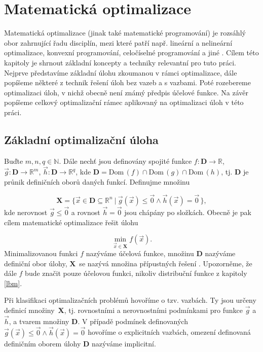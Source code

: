 \chapter{Matematická optimalizace}\label{optimalizace}

Matematická optimalizace (jinak také matematické programování) je rozsáhlý obor zahrnující řadu disciplín, mezi které patří např. lineární a nelineární optimalizace, konvexní programování, celočíselné programování a jiné \cite{Bert}. Cílem této kapitoly je shrnout základní koncepty a techniky relevantní pro tuto práci. Nejprve představíme základní úlohu zkoumanou v rámci optimalizace, dále popíšeme některé z technik řešení úloh bez vazeb a s vazbami. Poté rozebereme optimalizaci úloh, v nichž obecně není známý předpis účelové funkce. Na závěr popíšeme celkový optimalizační rámec aplikovaný na optimalizaci úloh v této práci.

\section{Základní optimalizační úloha}

Buďte $ m, n, q \in \mathbb{N}$. Dále nechť jsou definovány spojité funkce $ f: \mathbf{D} \rightarrow \mathbb{R}$, $ \vec{g} : \mathbf{D} \rightarrow \mathbb{R}^m $, $ \vec{h} : \mathbf{D} \rightarrow \mathbb{R}^q $, kde $ \mathbf{D} = \mathrm{Dom} \, (f) \cap \mathrm{Dom} \, (g) \cap \mathrm{Dom} \, (h)$, tj. $ \mathbf{D} $ je průnik definičních oborů daných funkcí. Definujme množinu

\begin{equation}\label{eq:pripustna reseni}
\mathbf{X} = \big\{ \vec{x} \in \mathbf{D} \subseteq \mathbb{R}^n \ | \ \vec{g} (\vec{x}) \leq \vec{0} \wedge \vec{h} (\vec{x}) = \vec{0} \, \big\},
\end{equation}
kde nerovnost $ \vec{g} \leq \vec{0} $ a rovnost $ \vec{h} = \vec{0} $  jsou chápány po složkách. Obecně je pak cílem matematické optimalizace řešit úlohu

\begin{equation}\label{eq:zakladni uloha}
	\min_{\vec{x} \in \mathbf{X}} f(\vec{x}).
\end{equation}
Minimalizovanou funkci $ f $ nazýváme účelová funkce, množinu $ \mathbf{D} $ nazýváme definiční obor úlohy, $ \mathbf{X} $~se nazývá množina přípustných řešení \cite{Bert}. Upozorněme, že dále $ f $ bude značit pouze účelovou funkci, nikoliv distribuční funkce z kapitoly \ref{lbm}.

Při klasifikaci optimalizačních problémů hovoříme o tzv. vazbách. Ty jsou určeny definicí množiny~$ \mathbf{X} $, tj. rovnostními a nerovnostními podmínkami pro funkce $ \vec{g} $ a $ \vec{h} $, a tvarem množiny $ \mathbf{D} $. V případě podmínek definovaných $ \vec{g} (\vec{x}) \leq \vec{0} \wedge \vec{h} (\vec{x}) = \vec{0} $ hovoříme o explicitních vazbách, omezení definovaná definičním oborem úlohy $ \mathbf{D} $ nazýváme implicitní.

